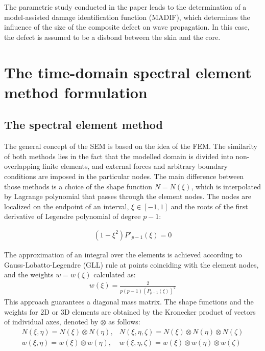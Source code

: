 \documentclass[a4paper,fleqn]{cas-sc}
\begin{document}
The parametric study conducted in the paper leads to the determination of a model-assisted damage identification function (MADIF), which determines the influence of the size of the composite defect on wave propagation.
In this case, the defect is assumed to be a disbond between the skin and the core.

\section{The time-domain spectral element method formulation}
\label{sec:time_SEM}
\subsection{The spectral element method}
\label{sec:sem}
The general concept of the SEM is based on the idea of the FEM.
The similarity of both methods lies in the fact that the modelled domain is divided into non-overlapping finite elements, and external forces and arbitrary boundary conditions are imposed in the particular nodes.
The main difference between those methods is a choice of the shape function \( N=N(\xi )\), which is interpolated by Lagrange polynomial that passes through the element nodes. The nodes are localized on the endpoint of an interval, \(\xi\in[-1,1]\) and the roots of the first derivative of Legendre polynomial of degree \(p-1\):

\begin{eqnarray}
	(1-\xi^2)P'_{p-1}(\xi)=0
	\label{eq:nodes}
\end{eqnarray}

The approximation of an integral over the elements is achieved according to Gauss-Lobatto-Legendre (GLL) rule at points coinciding with the element nodes, 
and the weights \(w=w(\xi)\) calculated as:
\begin{eqnarray}
	{w(\xi)} = \frac{2}{p(p-1)(P_{p-1}(\xi))^2}
	\label{eq:weights}
\end{eqnarray}
This approach guarantees a diagonal mass matrix.
The shape functions and the weights for 2D or 3D elements are obtained by the Kronecker product of vectors of individual axes, denoted by \(\otimes\) as follows:
\begin{eqnarray}
	N(\xi,\eta) = N(\xi)\otimes N(\eta), & N(\xi,\eta,\zeta) = N(\xi)\otimes N(\eta)\otimes N(\zeta) \nonumber\\
	w(\xi,\eta) = w(\xi)\otimes w(\eta), & w(\xi,\eta,\zeta) = w(\xi)\otimes w(\eta)\otimes w(\zeta) 
	\label{eq:3Dshape_weights}
\end{eqnarray}
\end{document}
